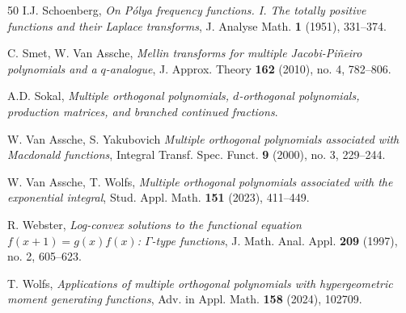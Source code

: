 \documentclass[a4paper,12pt,oneside]{article}
\theoremstyle{definition}
\begin{document}
\begin{thebibliography}{50}
I.J. Schoenberg,
\textit{On Pólya frequency functions. I. The totally positive functions and their Laplace transforms},
J. Analyse Math. \textbf{1} (1951), 331--374.

 C. Smet, W. Van Assche,
\textit{Mellin transforms for multiple Jacobi-Pi\~neiro polynomials and a $q$-analogue}, 
J. Approx. Theory \textbf{162} (2010), no. 4, 782--806.

 A.D. Sokal,
\textit{Multiple orthogonal polynomials, $d$-orthogonal polynomials, production matrices, and branched continued fractions}. 

 W. Van Assche, S. Yakubovich
\textit{Multiple orthogonal polynomials associated with Macdonald functions},
Integral Transf. Spec. Funct. \textbf{9} (2000), no. 3, 229--244.

 W. Van Assche, T. Wolfs,
\textit{Multiple orthogonal polynomials associated with the exponential integral},
Stud. Appl. Math. \textbf{151} (2023), 411--449.

R. Webster, 
\textit{Log-convex solutions to the functional equation $f(x+1)=g(x)f(x)$: $\Gamma$-type functions},
J. Math. Anal. Appl. \textbf{209} (1997), no. 2, 605--623.

 T. Wolfs, 
\textit{Applications of multiple orthogonal polynomials with hypergeometric moment generating functions},
Adv. in Appl. Math. \textbf{158} (2024), 102709.
\end{thebibliography}
\end{document}
